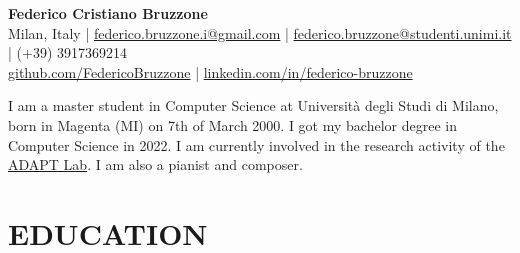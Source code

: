 \documentclass[a4paper,9pt]{extarticle}
\begin{document}
\pagestyle{empty}

\newcommand{\aladdin}{\href{https://aladdin.di.unimi.it/}{ALaDDIn}}
\newcommand{\bebrasit}{\href{https://bebras.it/}{italian website}}
\newcommand{\bebrasint}{\href{https://www.bebras.org/}{international website}}

\newcommand{\limlab}{\href{https://www.lim.di.unimi.it/}{LIM Lab}}
\newcommand{\ieeeofnn}{\href{https://ieee1599.lim.di.unimi.it/}{IEEE 1599}}

\newcommand{\adaptlab}{\href{https://cazzola.di.unimi.it/adapt-lab.html}{ADAPT Lab}}

\newcommand{\neverlang}{\href{https://www.sciencedirect.com/science/article/pii/S1477842415000056}{Neverlang}}
\newcommand{\golang}{\href{https://golang.org/}{GoLang}}
\newcommand{\python}{\href{https://www.python.org/}{Python}}
\newcommand{\numpy}{\href{https://numpy.org/}{NumPy}}
\newcommand{\pandas}{\href{https://pandas.pydata.org/}{Pandas}}

\newcommand{\believe}{\href{https://www.believemusic.com/}{Believe}}
\newcommand{\siae}{\href{https://www.siae.it/}{SIAE}}

\begin{center}
\textbf{\Large Federico Cristiano Bruzzone}\\[3pt] %
Milan, Italy |
\href{mailto:federico.bruzzone.i@gmail.com}{federico.bruzzone.i@gmail.com} |
\href{mailto:federico.bruzzone@studenti.unimi.it}{federico.bruzzone@studenti.unimi.it} |
(+39) 3917369214
\\
\href{https://github.com/FedericoBruzzone}{github.com/FedericoBruzzone} |
\href{https://www.linkedin.com/in/federico-bruzzone}{linkedin.com/in/federico-bruzzone}
\end{center}

\begin{center}
I am a master student in Computer Science at Università degli Studi di Milano, born in Magenta (MI) on 7th of March 2000. I got my bachelor degree in Computer Science in 2022. I am currently involved in the research activity of the \adaptlab. I am also a pianist and composer.\\
\end{center}


\section*{EDUCATION}
\end{document}
